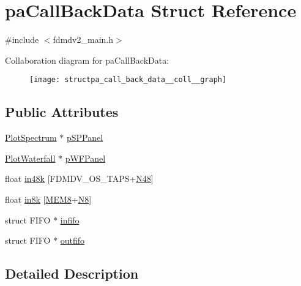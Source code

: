 \hypertarget{structpa_call_back_data}{\section{pa\-Call\-Back\-Data Struct Reference}
\label{structpa_call_back_data}
}


{\ttfamily \#include $<$fdmdv2\-\_\-main.\-h$>$}



Collaboration diagram for pa\-Call\-Back\-Data\-:
\nopagebreak
\begin{figure}[H]
\begin{center}
\leavevmode
\texttt{[image: structpa\_call\_back\_data\_\_coll\_\_graph]}
\end{center}
\end{figure}
\subsection*{Public Attributes}
\begin{DoxyCompactItemize}
\item 
\hyperlink{class_plot_spectrum}{Plot\-Spectrum} $\ast$ \hyperlink{structpa_call_back_data_a6741cb7e3a02a9a7edde123b8d810014}{p\-S\-P\-Panel}
\item 
\hyperlink{class_plot_waterfall}{Plot\-Waterfall} $\ast$ \hyperlink{structpa_call_back_data_a794284622a48e32d327f4787d9acb9fa}{p\-W\-F\-Panel}
\item 
float \hyperlink{structpa_call_back_data_a2f3083066c414621a834d3af98aa26cf}{in48k} \mbox{[}F\-D\-M\-D\-V\-\_\-\-O\-S\-\_\-\-T\-A\-P\-S+\hyperlink{fdmdv2__defines_8h_a5722111a885cb7609e36f98422626e8b}{N48}\mbox{]}
\item 
float \hyperlink{structpa_call_back_data_a1eaf4a649210c178b8671653b89e2141}{in8k} \mbox{[}\hyperlink{fdmdv2__defines_8h_abecf03ba94d7033c65398b6ebbf61919}{M\-E\-M8}+\hyperlink{fdmdv2__defines_8h_aae30e2de203d703d9ab68f0489f6b2d7}{N8}\mbox{]}
\item 
struct F\-I\-F\-O $\ast$ \hyperlink{structpa_call_back_data_adce1a4d7f2654a49440799ca0c3e25e1}{infifo}
\item 
struct F\-I\-F\-O $\ast$ \hyperlink{structpa_call_back_data_ab1114cd3fc9090e7cc89f6730481a890}{outfifo}
\end{DoxyCompactItemize}


\subsection{Detailed Description}


